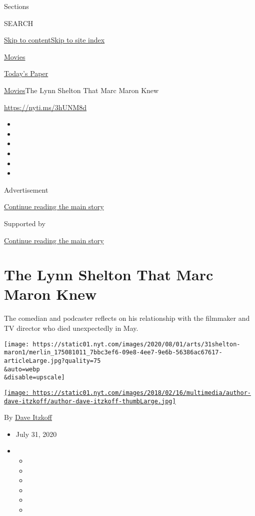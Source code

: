 Sections

SEARCH

\protect\hyperlink{site-content}{Skip to
content}\protect\hyperlink{site-index}{Skip to site index}

\href{https://www.nytimes.com/section/movies}{Movies}

\href{https://myaccount.nytimes.com/auth/login?response_type=cookie\&client_id=vi}{}

\href{https://www.nytimes.com/section/todayspaper}{Today's Paper}

\href{/section/movies}{Movies}\textbar{}The Lynn Shelton That Marc Maron
Knew

\url{https://nyti.ms/3hUNM8d}

\begin{itemize}
\item
\item
\item
\item
\item
\item
\end{itemize}

Advertisement

\protect\hyperlink{after-top}{Continue reading the main story}

Supported by

\protect\hyperlink{after-sponsor}{Continue reading the main story}

\hypertarget{the-lynn-shelton-that-marc-maron-knew}{%
\section{The Lynn Shelton That Marc Maron
Knew}\label{the-lynn-shelton-that-marc-maron-knew}}

The comedian and podcaster reflects on his relationship with the
filmmaker and TV director who died unexpectedly in May.

\texttt{[image: https://static01.nyt.com/images/2020/08/01/arts/31shelton-maron1/merlin\_175081011\_7bbc3ef6-09e8-4ee7-9e6b-56386ac67617-articleLarge.jpg?quality=75\\\&auto=webp\\\&disable=upscale]}

\href{https://www.nytimes.com/by/dave-itzkoff}{\texttt{[image: https://static01.nyt.com/images/2018/02/16/multimedia/author-dave-itzkoff/author-dave-itzkoff-thumbLarge.jpg]}}

By \href{https://www.nytimes.com/by/dave-itzkoff}{Dave Itzkoff}

\begin{itemize}
\item
  July 31, 2020
\item
  \begin{itemize}
  \item
  \item
  \item
  \item
  \item
  \item
  \end{itemize}
\end{itemize}


